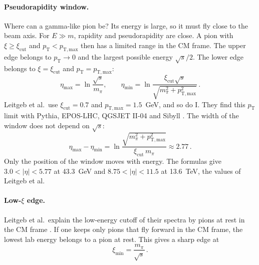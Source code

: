 \documentclass[11pt,a4paper]{article}
\newcommand{\pT}{\ensuremath{p_{\mathrm{T}}}}
\begin{document}
\paragraph{Pseudorapidity window.}
Where can a gamma-like pion be?
Its energy is large, so it must fly close to the beam axis.
For $E\gg m$, rapidity and pseudorapidity are close.
A pion with $\xi\geq\xi_{\mathrm{cut}}$ and $\pT<p_{\mathrm{T,max}}$ then has a limited range in the CM frame.
The upper edge belongs to $\pT\to0$ and the largest possible energy $\sqrt{s}/2$.
The lower edge belongs to $\xi=\xi_{\mathrm{cut}}$ and $\pT=p_{\mathrm{T,max}}$:
\begin{equation}
  \eta_{\max}=\ln\frac{\sqrt{s}}{m_{\pi}},\qquad
  \eta_{\min}=\ln\frac{\xi_{\mathrm{cut}}\sqrt{s}}{\sqrt{m_{\pi}^{2}+p_{\mathrm{T,max}}^{2}}}\,.
  \label{eq:window}
\end{equation}
Leitgeb et al.\ use $\xi_{\mathrm{cut}}=0.7$ and $p_{\mathrm{T,max}}=1.5$~GeV, and so do I.
They find this $\pT$ limit with Pythia, EPOS-LHC, QGSJET II-04 and Sibyll \cite{Leitgeb:2025prd}.
The width of the window does not depend on $\sqrt{s}$:
\begin{equation}
  \eta_{\max}-\eta_{\min}=\ln\frac{\sqrt{m_{\pi}^{2}+p_{\mathrm{T,max}}^{2}}}{\xi_{\mathrm{cut}}\,m_{\pi}}\approx 2.77\,.
  \label{eq:width}
\end{equation}
Only the position of the window moves with energy.
The formulas give $3.0<|\eta|<5.77$ at 43.3~GeV and $8.75<|\eta|<11.5$ at 13.6~TeV, the values of Leitgeb et al.

\paragraph{Low-$\xi$ edge.}
Leitgeb et al.\ explain the low-energy cutoff of their spectra by pions at rest in the CM frame \cite{Leitgeb:2025prd}.
If one keeps only pions that fly forward in the CM frame, the lowest lab energy belongs to a pion at rest.
This gives a sharp edge at
\begin{equation}
  \xi_{\min}=\frac{m_{\pi}}{\sqrt{s}}\,.
  \label{eq:edge}
\end{equation}
\end{document}
